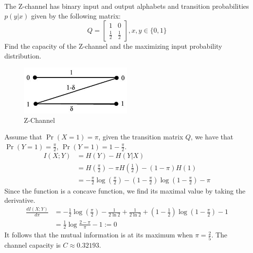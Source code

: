 \begin{exercise}[Z-channel]{ The Z-channel has binary input and output alphabets and transition probabilities $p(y | x)$ given by the following matrix:
$$Q=\left[\begin{array}{ll}1 & 0 \\ \frac{1}{2} & \frac{1}{2}\end{array}\right], x, y \in\{0,1\}$$
Find the capacity of the Z-channel and the maximizing input probability distribution.
\begin{figure}[H]
  \centering
  \includegraphics[height=2.5cm]{img/6-3.jpg}
  \caption{Z-Channel}
  \label{fig:z-chan}
\end{figure}
}
  \begin{solution}
  Assume that $\Pr(X=1)=\pi$, given the transition matrix $Q$, we have that $\Pr(Y=1) = \frac{\pi}{2}$, $\Pr(Y=1) = 1 - \frac{\pi}{2}$.
  \begin{equation}
    \begin{aligned}
      I(X;Y)&= H(Y) - H(Y|X) \\
      &= H(\frac{\pi}{2}) - \pi H(\frac{1}{2}) - (1-\pi)H(1) \\
      &= -\frac{\pi}{2} \log(\frac{\pi}{2}) - \left(1 - \frac{\pi}{2}\right) \log \left(1 - \frac{\pi}{2}\right) - \pi
    \end{aligned}
  \end{equation}
  Since the function is a concave function, we find its maximal value by taking the derivative.
  \begin{equation}
    \begin{aligned}
      \frac{dI(X;Y)}{d\pi} &= -\frac{1}{2} \log(\frac{\pi}{2}) - \frac{1}{2\ln 2} + \frac{1}{2\ln 2} + \left(1 - \frac{1}{2}\right) \log \left(1 - \frac{\pi}{2}\right) -1 \\
      &= \frac{1}{2} \log \frac{2-\pi}{\pi} - 1 := 0      
    \end{aligned}
  \end{equation}
  It follows that the mutual information is at its maximum when $\pi = \frac{2}{5}$. The channel capacity is $C \approx 0.32193$.
  \end{solution}
  \label{ex6-4}
\end{exercise}

